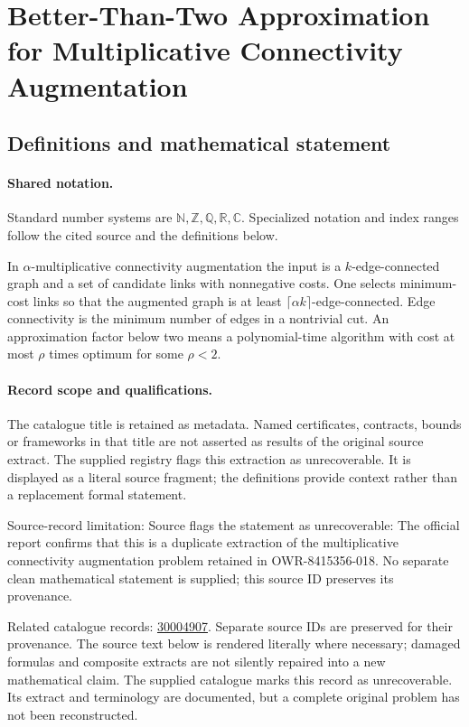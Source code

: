 \documentclass[11pt]{article}
\begin{document}
\section{Better-Than-Two Approximation for Multiplicative Connectivity Augmentation}\label{statement}

\subsection{Definitions and mathematical statement}

\paragraph{Shared notation.}Standard number systems are $\mathbb N,\mathbb Z,\mathbb Q,\mathbb R,\mathbb C$. Specialized notation and index ranges follow the cited source and the definitions below.


In $\alpha$-multiplicative connectivity augmentation the input is a $k$-edge-connected graph and a set of candidate links with nonnegative costs. One selects minimum-cost links so that the augmented graph is at least $\lceil\alpha k\rceil$-edge-connected. Edge connectivity is the minimum number of edges in a nontrivial cut. An approximation factor below two means a polynomial-time algorithm with cost at most $\rho$ times optimum for some $\rho<2$.
\paragraph{Record scope and qualifications.}
The catalogue title is retained as metadata. Named certificates, contracts, bounds or frameworks in that title are not asserted as results of the original source extract.
The supplied registry flags this extraction as unrecoverable. It is displayed as a literal source fragment; the definitions provide context rather than a replacement formal statement.

Source-record limitation: Source flags the statement as unrecoverable: The official report confirms that this is a duplicate extraction of the multiplicative connectivity augmentation problem retained in OWR-8415356-018. No separate clean mathematical statement is supplied; this source ID preserves its provenance.

Related catalogue records: \href{https://mehmetmars7.github.io/Erdosproblems-llm-hunter/problem.html?type=open_problems&id=30004907}{30004907}. Separate source IDs are preserved for their provenance.
The source text below is rendered literally where necessary; damaged formulas and composite extracts are not silently repaired into a new mathematical claim.
The supplied catalogue marks this record as unrecoverable. Its extract and terminology are documented, but a complete original problem has not been reconstructed.
\end{document}
